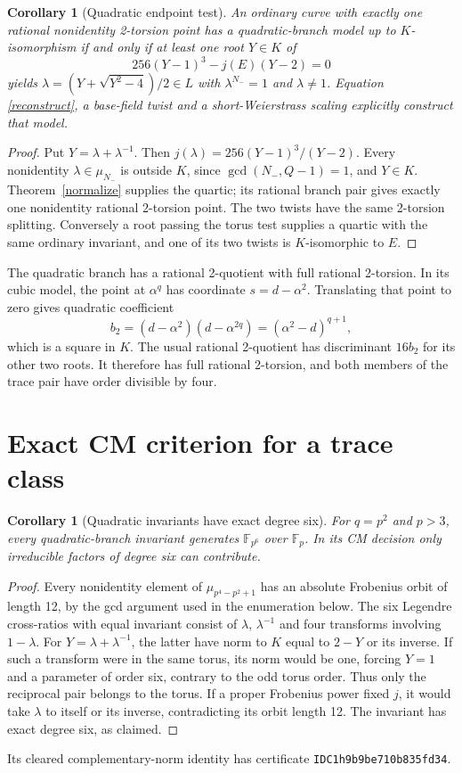 \documentclass[11pt]{article}
\newtheorem{corollary}[theorem]{Corollary}
\newcommand{\F}{\mathbb F}
\newcommand{\Nm}{N_-}
\begin{document}
\begin{corollary}[Quadratic endpoint test]\label{direct}
An ordinary curve with exactly one rational nonidentity 2-torsion point has
a quadratic-branch model up to $K$-isomorphism if and only if at least one
root $Y\in K$ of
\[
 256(Y-1)^3-j(E)(Y-2)=0
\]
yields $\lambda=(Y+\sqrt{Y^2-4})/2\in L$ with $\lambda^{\Nm}=1$
and $\lambda\ne1$. Equation \eqref{reconstruct}, a base-field twist and a
short-Weierstrass scaling explicitly construct that model.
\end{corollary}
\begin{proof}
Put $Y=\lambda+\lambda^{-1}$. Then
$j(\lambda)=256(Y-1)^3/(Y-2)$. Every nonidentity $\lambda\in\mu_{\Nm}$
is outside $K$, since $\gcd(\Nm,Q-1)=1$, and $Y\in K$.
Theorem~\ref{normalize} supplies the quartic; its rational branch pair gives
exactly one nonidentity rational 2-torsion point. The two twists have the same
2-torsion splitting. Conversely a root passing the torus test supplies a
quartic with the same ordinary invariant, and one of its two twists is
$K$-isomorphic to $E$.
\end{proof}

The quadratic branch has a rational 2-quotient with full rational 2-torsion.
In its cubic model, the point at $\alpha^q$ has coordinate
$s=d-\alpha^2$. Translating that point to zero gives quadratic coefficient
\[
 b_2=(d-\alpha^2)(d-\alpha^{2q})=(\alpha^2-d)^{q+1},
\]
which is a square in $K$. The usual rational 2-quotient has discriminant
$16b_2$ for its other two roots. It therefore has full rational 2-torsion,
and both members of the trace pair have order divisible by four.

\section{Exact CM criterion for a trace class}
\begin{corollary}[Quadratic invariants have exact degree six]
For $q=p^2$ and $p>3$, every quadratic-branch invariant generates
$\F_{p^6}$ over $\F_p$. In its CM decision only irreducible factors of
degree six can contribute.
\end{corollary}
\begin{proof}
Every nonidentity element of $\mu_{p^4-p^2+1}$ has an absolute Frobenius
orbit of length 12, by the gcd argument used in the enumeration below.
The six Legendre cross-ratios with equal invariant consist of $\lambda$,
$\lambda^{-1}$ and four transforms involving $1-\lambda$.
For $Y=\lambda+\lambda^{-1}$, the latter have norm to $K$ equal to
$2-Y$ or its inverse. If such a transform were in the same torus, its norm
would be one, forcing $Y=1$ and a parameter of order six, contrary to the
odd torus order. Thus only the reciprocal pair belongs to the torus.
If a proper Frobenius power fixed $j$, it would take $\lambda$ to itself
or its inverse, contradicting its orbit length 12. The invariant has exact
degree six, as claimed.
\end{proof}
Its cleared complementary-norm identity has certificate
\texttt{IDC1h9b9be710b835fd34}.
\end{document}
